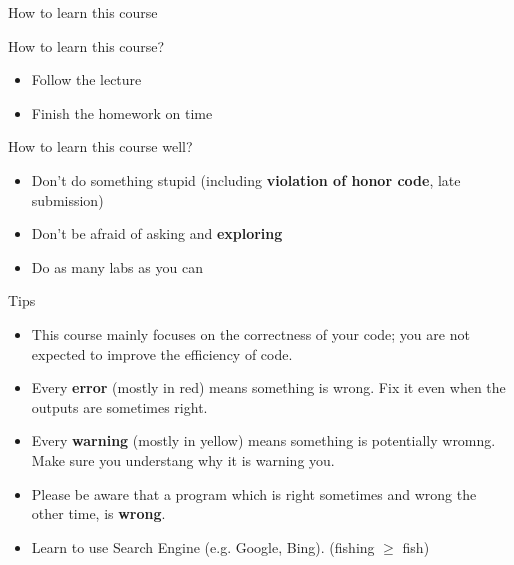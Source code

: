 \begin{frame}
\end{frame}

\begin{frame}{How to learn this course}
\begin{block}{How to learn this course?}
\begin{itemize}
    \item Follow the lecture
    \item Finish the homework on time
\end{itemize}
\end{block}

\begin{block}{How to learn this course well?}
\begin{itemize}
    \item Don't do something stupid (including \textbf{violation of honor code}, late submission)
    \item Don't be afraid of asking and \textbf{exploring}
    \item Do as many labs as you can
\end{itemize}
\end{block}
\end{frame}

\begin{frame}
\begin{block}{Tips}
\begin{itemize}
\item This course mainly focuses on the correctness of your code; you are not expected to improve the efficiency of code.
\item Every \textbf{error} (mostly in red) means something is wrong. Fix it even when the outputs are sometimes right.
\item Every \textbf{warning} (mostly in yellow) means something is potentially wromng. Make sure you understang why it is warning you.
\item Please be aware that a program which is right sometimes and wrong the other time, is \textbf{wrong}.
\item Learn to use Search Engine (e.g. Google, Bing). (fishing $\geq$ fish)
\end{itemize}
\end{block}
\end{frame}

